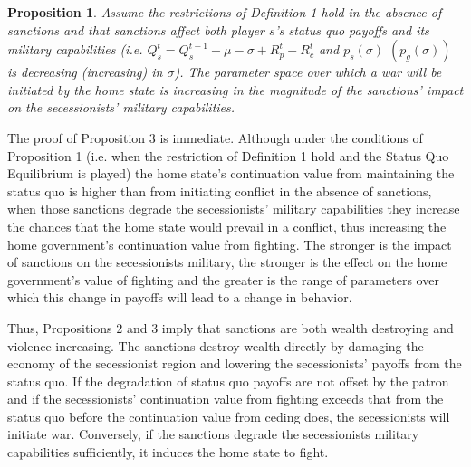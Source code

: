 \documentclass[11pt,letterpaper, notitlepage]{article}
\newtheorem{proposition}{Proposition}
\begin{document}
\begin{proposition}
Assume the restrictions of \emph{Definition 1} hold in the absence of sanctions and that sanctions affect both player $s$'s status quo payoffs and its military capabilities (i.e. $Q_s^t = Q_s^{t-1} - \mu -\sigma +R_p^t - R_c^t$ \emph{and} $p_s\left(\sigma\right)$ $\left(p_g\left(\sigma\right)\right)$ is decreasing (increasing) in $\sigma$). The parameter space over which a war will be initiated by the home state is increasing in the magnitude of the sanctions' impact on the secessionists' military capabilities.
\end{proposition}

The proof of Proposition 3 is immediate. Although under the conditions of Proposition 1 (i.e. when the restriction of Definition 1 hold and the Status Quo Equilibrium is played) the home state's continuation value from maintaining the status quo is higher than from initiating conflict in the absence of sanctions, when those sanctions degrade the secessionists' military capabilities they increase the chances that the home state would prevail in a conflict, thus increasing the home government's continuation value from fighting. The stronger is the impact of sanctions on the secessionists military, the stronger is the effect on the home government's value of fighting and the greater is the range of parameters over which this change in payoffs will lead to a change in behavior.

Thus, Propositions 2 and 3 imply that sanctions are both wealth destroying and violence increasing. The sanctions destroy wealth directly by damaging the economy of the secessionist region and lowering the secessionists' payoffs from the status quo. If the degradation of status quo payoffs are not offset by the patron and if the secessionists' continuation value from fighting exceeds that from the status quo before the continuation value from ceding does, the secessionists will initiate war. Conversely, if the sanctions degrade the secessionists military capabilities sufficiently, it induces the home state to fight.
\end{document}
